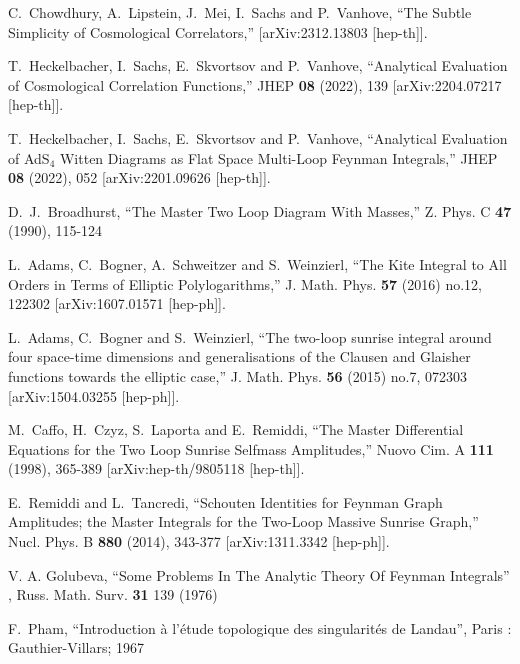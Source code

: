 \documentclass[a4paper,12pt]{article}
\numberwithin{equation}{section}
\numberwithin{figure}{section}
\begin{document}
\begin{thebibliography}{99}

C.~Chowdhury, A.~Lipstein, J.~Mei, I.~Sachs and P.~Vanhove,
``The Subtle Simplicity of Cosmological Correlators,''
[arXiv:2312.13803 [hep-th]].

T.~Heckelbacher, I.~Sachs, E.~Skvortsov and P.~Vanhove,
``Analytical Evaluation of Cosmological Correlation Functions,''
JHEP \textbf{08} (2022), 139
[arXiv:2204.07217 [hep-th]].

T.~Heckelbacher, I.~Sachs, E.~Skvortsov and P.~Vanhove,
``Analytical Evaluation of AdS$_{4}$ Witten Diagrams as Flat Space Multi-Loop Feynman Integrals,''
JHEP \textbf{08} (2022), 052
[arXiv:2201.09626 [hep-th]].


D.~J.~Broadhurst,
``The Master Two Loop Diagram With Masses,''
Z. Phys. C \textbf{47} (1990), 115-124
  
L.~Adams, C.~Bogner, A.~Schweitzer and S.~Weinzierl,
``The Kite Integral to All Orders in Terms of Elliptic Polylogarithms,''
J. Math. Phys. \textbf{57} (2016) no.12, 122302
[arXiv:1607.01571 [hep-ph]].
  
L.~Adams, C.~Bogner and S.~Weinzierl,
``The two-loop sunrise integral around four space-time dimensions and generalisations of the Clausen and Glaisher functions towards the elliptic case,''
J. Math. Phys. \textbf{56} (2015) no.7, 072303
[arXiv:1504.03255 [hep-ph]].
  
M.~Caffo, H.~Czyz, S.~Laporta and E.~Remiddi,
``The Master Differential Equations for the Two Loop Sunrise Selfmass Amplitudes,''
Nuovo Cim. A \textbf{111} (1998), 365-389
[arXiv:hep-th/9805118 [hep-th]].
  
E.~Remiddi and L.~Tancredi,
``Schouten Identities for Feynman Graph Amplitudes; the Master Integrals for the Two-Loop Massive Sunrise Graph,''
Nucl. Phys. B \textbf{880} (2014), 343-377
[arXiv:1311.3342 [hep-ph]].
  
 V. A. Golubeva, ``Some Problems In The Analytic
  Theory Of Feynman Integrals'' , Russ. Math. Surv. {\bf 31} 139 (1976)

 F.~Pham, ``Introduction \`a l'\'etude topologique des
  singularit\'es de Landau'', Paris : Gauthier-Villars; 1967


\end{thebibliography}
\end{document}
